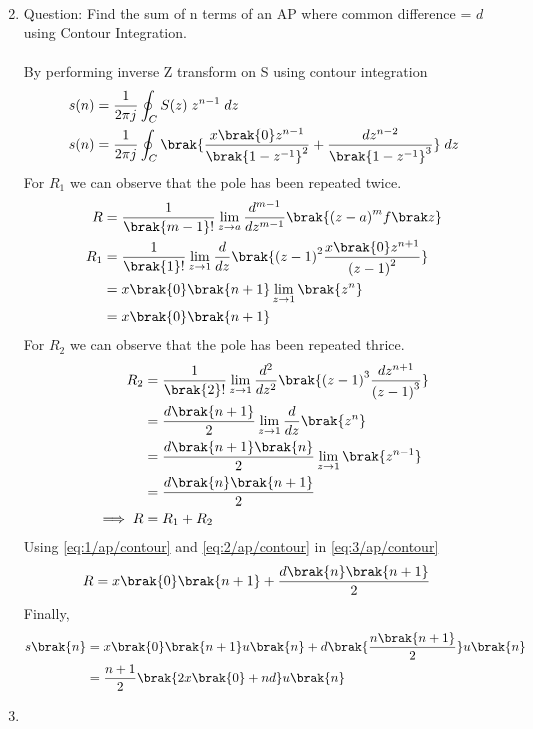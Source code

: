 \begin{enumerate}[label=\thechapter.\arabic*,ref=\thechapter.\theenumi]
\begin{align}
\end{align}
\item 
Question: Find the sum of n terms of an AP where common difference = $d$ using Contour Integration.\\
\solution\\
By performing inverse Z transform on S using contour integration
\begin{align}
   s(n)&=\frac{1}{2\pi j}\oint_{C}S(z) \;z^{n-1} \;dz  \\
   s(n)&=\frac{1}{2\pi j}\oint_{C}\brak{\dfrac{x\brak{0}z^{n-1}}{\brak{1-z^{-1}}^2} + \dfrac{dz^{n-2}}{\brak{1-z^{-1}}^{3}}}\;dz  
\end{align}
For $R_1$ we can observe that the pole has been repeated twice.
\begin{align}
    R&=\frac{1}{\brak {m-1}!}\lim\limits_{z\to a}\frac{d^{m-1}}{dz^{m-1}}\brak {{(z-a)}^{m}f\brak z}\\
    R_1&=\frac{1}{\brak {1}!}\lim\limits_{z\to 1}\frac{d}{dz}\brak {{(z-1)}^{2}\frac{x\brak{0}z^{n+1}}{{(z-1)}^2}}\\
    &=x\brak{0}\brak{n+1}\lim\limits_{z\to 1}\brak{z^n}\\
    &=x\brak{0}\brak{n+1}\label{eq:1/ap/contour}
\end{align}
For $R_2$ we can observe that the pole has been repeated thrice.
\begin{align}
    R_2&=\frac{1}{\brak {2}!}\lim\limits_{z\to 1}\frac{d^{2}}{dz^{2}}\brak {{(z-1)}^{3}\frac{dz^{n+1}}{{(z-1)}^3}}\\
    &=\frac{d\brak{n+1}}{2}\lim\limits_{z\to 1}\frac{d}{dz}\brak{z^n}\\
    &=\frac{d\brak{n+1}\brak{n}}{2}\lim\limits_{z\to 1}\brak{z^{n-1}}\\
    &=\frac{d\brak{n}\brak{n+1}}{2}\label{eq:2/ap/contour} \\
    \implies R&= R_1 + R_2\label{eq:3/ap/contour}
\end{align}
Using \eqref{eq:1/ap/contour} and \eqref{eq:2/ap/contour} in \eqref{eq:3/ap/contour}
\begin{align}
   R &=x\brak{0}\brak{n+1}+\frac{d\brak{n}\brak{n+1}}{2}
\end{align}
Finally,
\begin{align}
    s\brak{n}&=x\brak{0}\brak{n+1}u\brak{n}+d\brak{\dfrac{{n\brak{n+1}}}{2}}u\brak{n}\\
    &=\dfrac{n+1}{2}\brak{2x\brak{0}+nd}u\brak{n}
\end{align}
\item

\end{enumerate}
